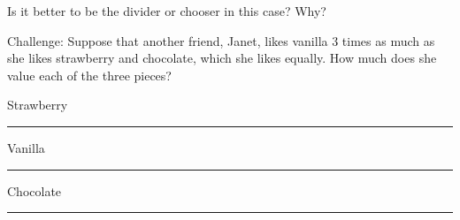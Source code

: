 \documentclass[12pt]{article}
\newcommand{\ans}[1][1in]{\rule{#1}{.5pt}}
\begin{document}
\begin{enumerate}
\vspace{1cm}


%
%

\item Is it better to be the divider or chooser in this case? Why? 

\vspace{1cm}

\begin{minipage}{.7\textwidth}
\item Challenge: Suppose that another friend, Janet, likes vanilla 3 times as much as she likes strawberry and chocolate, which she likes equally. How much does she value each of the three pieces?
\end{minipage}
\begin{minipage}{.3\textwidth}
\hfill{}
\end{minipage}

Strawberry \ans Vanilla \ans Chocolate \ans

\end{enumerate}
\end{document}
